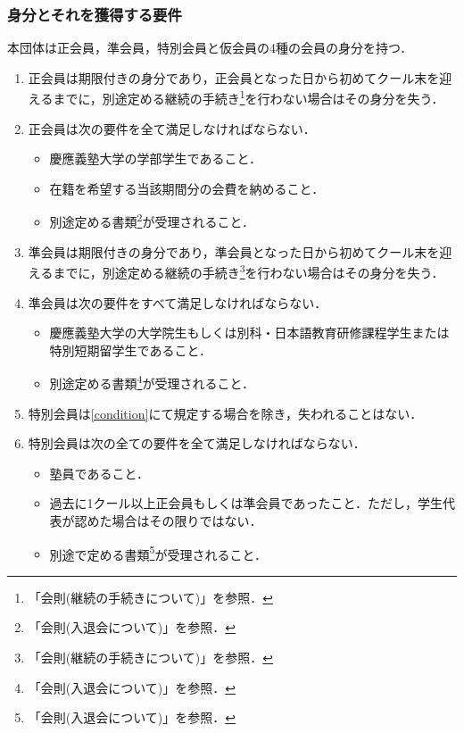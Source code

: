 \documentclass{ltjsarticle}
\begin{document}
      \subsubsection{身分とそれを獲得する要件}\label{certificate}
        \jor
        本団体は正会員，準会員，特別会員と仮会員の4種の会員の身分を持つ．
        \begin{enumerate}
          \item 正会員は期限付きの身分であり，正会員となった日から初めてクール末を迎えるまでに，別途定める継続の手続き\footnote{「会則(継続の手続きについて)」を参照．}を行わない場合はその身分を失う．
          \item 正会員は次の要件を全て満足しなければならない．
                \begin{itemize}
                  \item 慶應義塾大学の学部学生であること．
                  \item 在籍を希望する当該期間分の会費を納めること．
                  \item 別途定める書類\footnote{「会則(入退会について)」を参照．}が受理されること．
                \end{itemize}
          \item 準会員は期限付きの身分であり，準会員となった日から初めてクール末を迎えるまでに，別途定める継続の手続き\footnote{「会則(継続の手続きについて)」を参照．}を行わない場合はその身分を失う．
          \item 準会員は次の要件をすべて満足しなければならない．
                \begin{itemize}
                  \item 慶應義塾大学の大学院生もしくは別科・日本語教育研修課程学生または特別短期留学生であること．
                  \item 別途定める書類\footnote{「会則(入退会について)」を参照．}が受理されること．
                \end{itemize}
          \item 特別会員は\ref{condition}にて規定する場合を除き，失われることはない．
          \item 特別会員は次の全ての要件を全て満足しなければならない．
                \begin{itemize}
                  \item 塾員であること．
                  \item 過去に1クール以上正会員もしくは準会員であったこと．ただし，学生代表が認めた場合はその限りではない．
                  \item 別途で定める書類\footnote{「会則(入退会について)」を参照．}が受理されること．

\end{itemize}
\end{enumerate}
\end{document}
